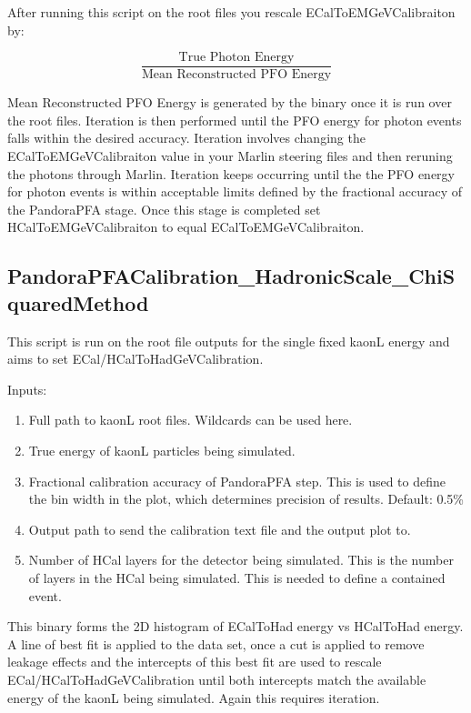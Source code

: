 \documentclass[11pt, oneside]{article}   	%
\begin{document}
After running this script on the root files you rescale ECalToEMGeVCalibraiton by:

\begin{equation}
\frac{\text{True Photon Energy}}{\text{Mean Reconstructed PFO Energy}}
\end{equation}

Mean Reconstructed PFO Energy is generated by the binary once it is run over the root files.  Iteration is then performed until the PFO energy for photon events falls within the desired accuracy.  Iteration involves changing the ECalToEMGeVCalibraiton value in your Marlin steering files and then reruning the photons through Marlin.  Iteration keeps occurring until the the PFO energy for photon events is within acceptable limits defined by the fractional accuracy of the PandoraPFA stage.  Once this stage is completed set HCalToEMGeVCalibraiton to equal ECalToEMGeVCalibraiton.

\subsection{PandoraPFACalibration\_HadronicScale\_ChiSquaredMethod}

This script is run on the root file outputs for the single fixed kaonL energy and aims to set ECal/HCalToHadGeVCalibration.

Inputs:
\begin{enumerate}
\item Full path to kaonL root files.  Wildcards can be used here.
\item True energy of kaonL particles being simulated.
\item Fractional calibration accuracy of PandoraPFA step.  This is used to define the bin width in the plot, which determines precision of results.  Default: 0.5\%
\item Output path to send the calibration text file and the output plot to.
\item Number of HCal layers for the detector being simulated.  This is the number of layers in the HCal being simulated.  This is needed to define a contained event.
\end{enumerate}

This binary forms the 2D histogram of ECalToHad energy vs HCalToHad energy.  A line of best fit is applied to the data set, once a cut is applied to remove leakage effects and the intercepts of this best fit are used to rescale ECal/HCalToHadGeVCalibration until both intercepts match the available energy of the kaonL being simulated.  Again this requires iteration.  
\end{document}
